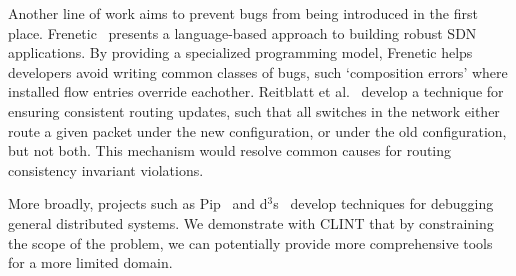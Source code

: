 Another line of work aims to prevent bugs from being introduced in the first
place. Frenetic~\cite{frenetic} presents a language-based approach to building
robust SDN applications. By providing a specialized programming model, Frenetic helps developers avoid writing common classes of
bugs, such `composition errors' where installed flow entries override eachother.
Reitblatt et al.~\cite{consistentupdates} develop a technique for ensuring
consistent routing updates, such that all switches in the network either route
a given packet under the new configuration, or under the old configuration,
but not both. This mechanism would resolve common causes for routing consistency 
invariant violations.

More broadly, projects such as Pip~\cite{pip} and d$^3$s~\cite{d3s} develop
techniques for debugging general distributed systems.  We demonstrate with CLINT that by constraining the scope of the problem,
we can potentially provide more comprehensive tools for a more limited domain.






